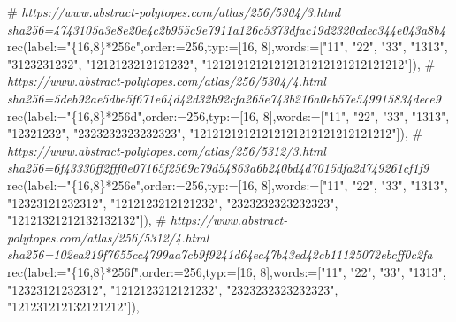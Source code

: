 \documentclass[
  10pt,
  letterpaper,
]{article}
\newenvironment{Shaded}{}{}
\newcommand{\CommentTok}[1]{\textcolor[rgb]{0.38,0.63,0.69}{\textit{#1}}}
\newcommand{\ExtensionTok}[1]{#1}
\newcommand{\FloatTok}[1]{\textcolor[rgb]{0.25,0.63,0.44}{#1}}
\newcommand{\NormalTok}[1]{#1}
\newcommand{\OperatorTok}[1]{\textcolor[rgb]{0.40,0.40,0.40}{#1}}
\newcommand{\StringTok}[1]{\textcolor[rgb]{0.25,0.44,0.63}{#1}}
\newcommand{\VariableTok}[1]{\textcolor[rgb]{0.10,0.09,0.49}{#1}}
\begin{document}
\begin{Shaded}
\begin{Highlighting}[]
\NormalTok{\#}\CommentTok{ https://www.abstract{-}polytopes.com/atlas/256/5304/3.html sha256=4743105a3e8e20e4c2b955c9e7911a126c5373dfac19d2320cdec344e043a8b4}
\ExtensionTok{rec}\NormalTok{(}\VariableTok{label}\OperatorTok{:=}\StringTok{"\{16,8\}*256c"}\OperatorTok{,}\VariableTok{order}\OperatorTok{:=}\FloatTok{256}\OperatorTok{,}\VariableTok{typ}\OperatorTok{:=}\NormalTok{[}\FloatTok{16}\OperatorTok{,} \FloatTok{8}\NormalTok{]}\OperatorTok{,}\VariableTok{words}\OperatorTok{:=}\NormalTok{[}\StringTok{"11"}\OperatorTok{,} \StringTok{"22"}\OperatorTok{,} \StringTok{"33"}\OperatorTok{,} \StringTok{"1313"}\OperatorTok{,} \StringTok{"3123231232"}\OperatorTok{,} \StringTok{"1212123212121232"}\OperatorTok{,} \StringTok{"12121212121212121212121212121212"}\NormalTok{])}\OperatorTok{,}
\NormalTok{\#}\CommentTok{ https://www.abstract{-}polytopes.com/atlas/256/5304/4.html sha256=5deb92ae5dbe5f671e64d42d32b92cfa265e743b216a0eb57e549915834dece9}
\ExtensionTok{rec}\NormalTok{(}\VariableTok{label}\OperatorTok{:=}\StringTok{"\{16,8\}*256d"}\OperatorTok{,}\VariableTok{order}\OperatorTok{:=}\FloatTok{256}\OperatorTok{,}\VariableTok{typ}\OperatorTok{:=}\NormalTok{[}\FloatTok{16}\OperatorTok{,} \FloatTok{8}\NormalTok{]}\OperatorTok{,}\VariableTok{words}\OperatorTok{:=}\NormalTok{[}\StringTok{"11"}\OperatorTok{,} \StringTok{"22"}\OperatorTok{,} \StringTok{"33"}\OperatorTok{,} \StringTok{"1313"}\OperatorTok{,} \StringTok{"12321232"}\OperatorTok{,} \StringTok{"2323232323232323"}\OperatorTok{,} \StringTok{"12121212121212121212121212121212"}\NormalTok{])}\OperatorTok{,}
\NormalTok{\#}\CommentTok{ https://www.abstract{-}polytopes.com/atlas/256/5312/3.html sha256=6f43330ff2fff0e07165f2569c79d54863a6b240bd4d7015dfa2d749261cf1f9}
\ExtensionTok{rec}\NormalTok{(}\VariableTok{label}\OperatorTok{:=}\StringTok{"\{16,8\}*256e"}\OperatorTok{,}\VariableTok{order}\OperatorTok{:=}\FloatTok{256}\OperatorTok{,}\VariableTok{typ}\OperatorTok{:=}\NormalTok{[}\FloatTok{16}\OperatorTok{,} \FloatTok{8}\NormalTok{]}\OperatorTok{,}\VariableTok{words}\OperatorTok{:=}\NormalTok{[}\StringTok{"11"}\OperatorTok{,} \StringTok{"22"}\OperatorTok{,} \StringTok{"33"}\OperatorTok{,} \StringTok{"1313"}\OperatorTok{,} \StringTok{"12323121232312"}\OperatorTok{,} \StringTok{"1212123212121232"}\OperatorTok{,} \StringTok{"2323232323232323"}\OperatorTok{,} \StringTok{"12121321212132132132"}\NormalTok{])}\OperatorTok{,}
\NormalTok{\#}\CommentTok{ https://www.abstract{-}polytopes.com/atlas/256/5312/4.html sha256=102ea219f7655cc4799aa7cb9f9241d64ec47b43ed42cb11125072ebcff0c2fa}
\ExtensionTok{rec}\NormalTok{(}\VariableTok{label}\OperatorTok{:=}\StringTok{"\{16,8\}*256f"}\OperatorTok{,}\VariableTok{order}\OperatorTok{:=}\FloatTok{256}\OperatorTok{,}\VariableTok{typ}\OperatorTok{:=}\NormalTok{[}\FloatTok{16}\OperatorTok{,} \FloatTok{8}\NormalTok{]}\OperatorTok{,}\VariableTok{words}\OperatorTok{:=}\NormalTok{[}\StringTok{"11"}\OperatorTok{,} \StringTok{"22"}\OperatorTok{,} \StringTok{"33"}\OperatorTok{,} \StringTok{"1313"}\OperatorTok{,} \StringTok{"12323121232312"}\OperatorTok{,} \StringTok{"1212123212121232"}\OperatorTok{,} \StringTok{"2323232323232323"}\OperatorTok{,} \StringTok{"121231212132121212"}\NormalTok{])}\OperatorTok{,}

\end{Highlighting}
\end{Shaded}
\end{document}
